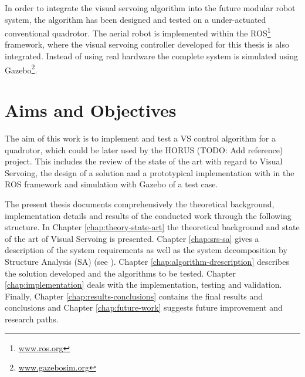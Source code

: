 
In order to integrate the visual servoing algorithm into the future modular robot system, the algorithm has been designed and tested on a under-actuated conventional quadrotor. The aerial robot is implemented within the ROS\footnote{\url{www.ros.org}} framework, where the visual servoing controller developed for this thesis is also integrated. Instead of using real hardware the complete system is simulated using Gazebo\footnote{\url{ www.gazebosim.org}}.


\section{Aims and Objectives}
\label{sec:aims-objectives}

The aim of this work is to implement and test a VS control algorithm for a quadrotor, which could be later used by the HORUS (TODO: Add reference) project. This includes the review of the state of the art with regard to Visual Servoing, the design of a solution and a prototypical implementation with in the ROS framework and simulation with Gazebo of a test case.

The present thesis documents comprehensively the theoretical background, implementation details and results of the conducted work through the following structure. In Chapter \ref{chap:theory-state-art} the theoretical background and state of the art of Visual Servoing is presented. Chapter \ref{chap:srs-sa} gives a description of the system requirements as well as the system decomposition by Structure Analysis (SA) (see \cite{SA_Braune}). Chapter \ref{chap:algorithm-drescription} describes the solution developed and the algorithms to be tested. Chapter \ref{chap:implementation} deals with the implementation, testing and validation. Finally, Chapter \ref{chap:results-conclusions} contains the final results and conclusions and Chapter \ref{chap:future-work} suggests future improvement and research paths.

